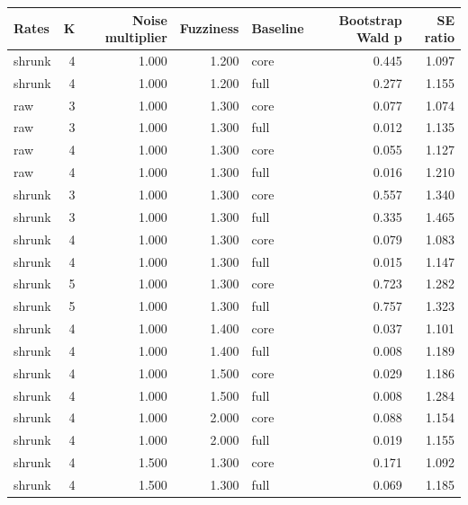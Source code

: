 \begin{tabular}{lrrrlrr}
\toprule
Rates & K & Noise multiplier & Fuzziness & Baseline & Bootstrap Wald p & SE ratio \\
\midrule
shrunk & 4 & 1.000 & 1.200 & core & 0.445 & 1.097 \\
shrunk & 4 & 1.000 & 1.200 & full & 0.277 & 1.155 \\
raw & 3 & 1.000 & 1.300 & core & 0.077 & 1.074 \\
raw & 3 & 1.000 & 1.300 & full & 0.012 & 1.135 \\
raw & 4 & 1.000 & 1.300 & core & 0.055 & 1.127 \\
raw & 4 & 1.000 & 1.300 & full & 0.016 & 1.210 \\
shrunk & 3 & 1.000 & 1.300 & core & 0.557 & 1.340 \\
shrunk & 3 & 1.000 & 1.300 & full & 0.335 & 1.465 \\
shrunk & 4 & 1.000 & 1.300 & core & 0.079 & 1.083 \\
shrunk & 4 & 1.000 & 1.300 & full & 0.015 & 1.147 \\
shrunk & 5 & 1.000 & 1.300 & core & 0.723 & 1.282 \\
shrunk & 5 & 1.000 & 1.300 & full & 0.757 & 1.323 \\
shrunk & 4 & 1.000 & 1.400 & core & 0.037 & 1.101 \\
shrunk & 4 & 1.000 & 1.400 & full & 0.008 & 1.189 \\
shrunk & 4 & 1.000 & 1.500 & core & 0.029 & 1.186 \\
shrunk & 4 & 1.000 & 1.500 & full & 0.008 & 1.284 \\
shrunk & 4 & 1.000 & 2.000 & core & 0.088 & 1.154 \\
shrunk & 4 & 1.000 & 2.000 & full & 0.019 & 1.155 \\
shrunk & 4 & 1.500 & 1.300 & core & 0.171 & 1.092 \\
shrunk & 4 & 1.500 & 1.300 & full & 0.069 & 1.185 \\
\bottomrule
\end{tabular}
